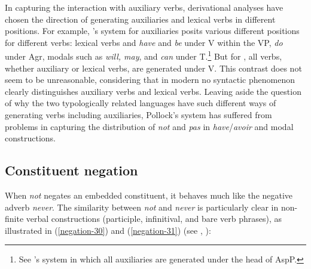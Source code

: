 \documentclass[output=paper
	        ,collection
	        ,collectionchapter
 	        ,biblatex
                ,babelshorthands
                ,newtxmath
                ,draftmode
                ,colorlinks, citecolor=brown
]{langscibook}
\begin{document}
\begin{exe}
\begin{xlist}
\begin{exe}
\begin{xlist}
{In capturing the interaction with auxiliary verbs, derivational analyses have chosen the direction of generating
auxiliaries and lexical  verbs in different positions. For example,
\citet{Pollock:89}'s system for  auxiliaries posits
various different positions for different verbs: lexical
verbs and \textit{have} and \textit{be} under V within the VP,
\textit{do} under Agr, modals such as \textit{will, may}, and \textit{can}
under T.\footnote{See \citep{Ouhalla:91}'s system in which
all auxiliaries are generated under the head of AspP.} But for ,
all verbs, whether
auxiliary or lexical  verbs, are generated under V.
This contrast does not seem to be unreasonable, considering that in
modern  no syntactic phenomenon clearly distinguishes auxiliary
verbs and lexical  verbs. Leaving aside the question of why the two
typologically related languages have such different ways of generating
verbs including auxiliaries, Pollock's system has suffered
from problems in capturing the distribution of \textit{not} and
\textit{pas} in \textit{have}/\textit{avoir} and modal constructions.}
\fi

\subsection{Constituent negation}

When  \textit{not} negates an embedded constituent, it behaves
much like the negative adverb \textit{never}. The similarity between {\it
not} and \textit{never} is particularly clear in non-finite verbal
constructions (participle, infinitival, and bare verb phrases), as
illustrated in (\ref{negation-30}) and (\ref{negation-31}) (see \citealt{Klima:64,Kim:00},
\citealt[]{kimmichaelis:2020}):

\eal\label{negation-30}
\zl


\end{xlist}
\end{exe}
\end{xlist}
\end{exe}
\end{document}
